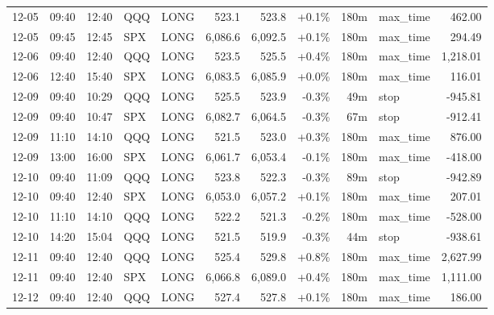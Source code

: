 \documentclass[11pt,a4paper,twoside]{article}
\begin{document}
\begin{center}
\begin{longtable}{>{\color{txtmain}}l l l l l r r r r >{\color{txtmain}}l r}
12-05 & 09:40 & 12:40 & QQQ & LONG & 523.1 & 523.8 & \textcolor{wingreen}{+0.1\%} & 180m & max\_time & \textcolor{wingreen}{462.00} \\
12-05 & 09:45 & 12:45 & SPX & LONG & 6,086.6 & 6,092.5 & \textcolor{wingreen}{+0.1\%} & 180m & max\_time & \textcolor{wingreen}{294.49} \\
12-06 & 09:40 & 12:40 & QQQ & LONG & 523.5 & 525.5 & \textcolor{wingreen}{+0.4\%} & 180m & max\_time & \textcolor{wingreen}{1,218.01} \\
12-06 & 12:40 & 15:40 & SPX & LONG & 6,083.5 & 6,085.9 & \textcolor{wingreen}{+0.0\%} & 180m & max\_time & \textcolor{wingreen}{116.01} \\
12-09 & 09:40 & 10:29 & QQQ & LONG & 525.5 & 523.9 & \textcolor{lossred}{-0.3\%} & 49m & stop & \textcolor{lossred}{-945.81} \\
12-09 & 09:40 & 10:47 & SPX & LONG & 6,082.7 & 6,064.5 & \textcolor{lossred}{-0.3\%} & 67m & stop & \textcolor{lossred}{-912.41} \\
12-09 & 11:10 & 14:10 & QQQ & LONG & 521.5 & 523.0 & \textcolor{wingreen}{+0.3\%} & 180m & max\_time & \textcolor{wingreen}{876.00} \\
12-09 & 13:00 & 16:00 & SPX & LONG & 6,061.7 & 6,053.4 & \textcolor{lossred}{-0.1\%} & 180m & max\_time & \textcolor{lossred}{-418.00} \\
12-10 & 09:40 & 11:09 & QQQ & LONG & 523.8 & 522.3 & \textcolor{lossred}{-0.3\%} & 89m & stop & \textcolor{lossred}{-942.89} \\
12-10 & 09:40 & 12:40 & SPX & LONG & 6,053.0 & 6,057.2 & \textcolor{wingreen}{+0.1\%} & 180m & max\_time & \textcolor{wingreen}{207.01} \\
12-10 & 11:10 & 14:10 & QQQ & LONG & 522.2 & 521.3 & \textcolor{lossred}{-0.2\%} & 180m & max\_time & \textcolor{lossred}{-528.00} \\
12-10 & 14:20 & 15:04 & QQQ & LONG & 521.5 & 519.9 & \textcolor{lossred}{-0.3\%} & 44m & stop & \textcolor{lossred}{-938.61} \\
12-11 & 09:40 & 12:40 & QQQ & LONG & 525.4 & 529.8 & \textcolor{wingreen}{+0.8\%} & 180m & max\_time & \textcolor{wingreen}{2,627.99} \\
12-11 & 09:40 & 12:40 & SPX & LONG & 6,066.8 & 6,089.0 & \textcolor{wingreen}{+0.4\%} & 180m & max\_time & \textcolor{wingreen}{1,111.00} \\
12-12 & 09:40 & 12:40 & QQQ & LONG & 527.4 & 527.8 & \textcolor{wingreen}{+0.1\%} & 180m & max\_time & \textcolor{wingreen}{186.00} \\

\end{longtable}
\end{center}
\end{document}

